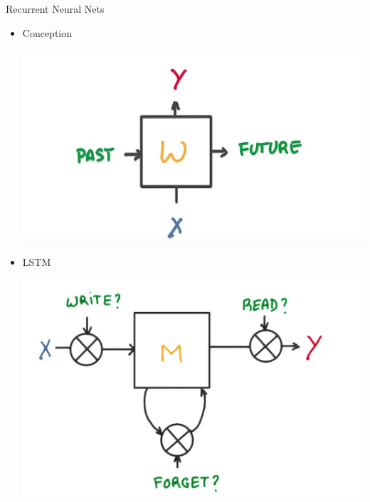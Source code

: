 \documentclass{beamer}
\begin{document}
\begin{frame}{Recurrent Neural Nets}
	\begin{itemize}
		  \item Conception
		
		\begin{center}
			  \includegraphics[scale=0.3]{img/recurent}
		\end{center}
		
		  \item LSTM
		\begin{center}
			  \includegraphics[scale=0.15]{img/lstm}
		\end{center}
	\end{itemize}
\end{frame}
\end{document}
